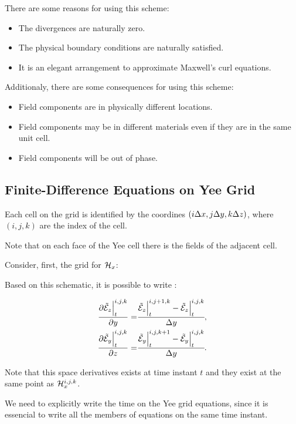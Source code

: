 There are some reasons for using this scheme:
\begin{itemize}
    \item The divergences are naturally zero.
    \item The physical boundary conditions are naturally satisfied.
    \item It is an elegant arrangement to approximate Maxwell's curl equations.
\end{itemize}

Additionaly, there are some consequences for using this scheme:
\begin{itemize}
    \item Field components are in physically different locations.
    \item Field components may be in different materials even if they are in the same unit cell.
    \item Field components will be out of phase.
\end{itemize}

\subsection{Finite-Difference Equations on Yee Grid}

Each cell on the grid is identified by the coordines $(i\Delta x, j\Delta y, k\Delta z)$, where $(i, j, k)$ are the index of the cell.

Note that on each face of the Yee cell there is the fields of the adjacent cell.

Consider, first, the grid for $\mathcal{H}_x$:



Based on this schematic, it is possible to write \cite{rumpf_book}:

\begin{align}
    \frac{\partial \tilde{\mathcal{E}}_z\Big|^{i,j,k}_t}{\partial y} =& \cfrac{\tilde{\mathcal{E}}_z\Big|^{i,j+1,k}_t-\tilde{\mathcal{E}}_z\Big|^{i,j,k}_t}{\Delta y}, \\
    \frac{\partial \tilde{\mathcal{E}}_y\Big|^{i,j,k}_t}{\partial z} =& \cfrac{\tilde{\mathcal{E}}_y\Big|^{i,j,k+1}_t-\tilde{\mathcal{E}}_y\Big|^{i,j,k}_t}{\Delta y}.
\end{align}

Note that this space derivatives exists at time instant $t$ and they exist at the same point as $\mathcal{H}_x^{i,j,k}$.

We need to explicitly write the time on the Yee grid equations, since it is essencial to write all the members of equations on the same time instant.

